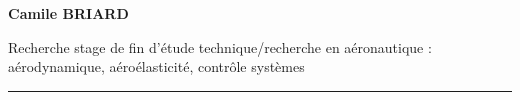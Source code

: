 \begin{center}
  {\Huge\bfseries\color{accent}Camile BRIARD}\par
  \vspace{4pt}
  {\large\color{textsoft} Recherche stage de fin d'étude technique/recherche en aéronautique : aérodynamique, aéroélasticité, contrôle systèmes}\par
\end{center}
\vspace{4pt}
{\color{accent}\rule{\linewidth}{0.8pt}}
\vspace{6pt}